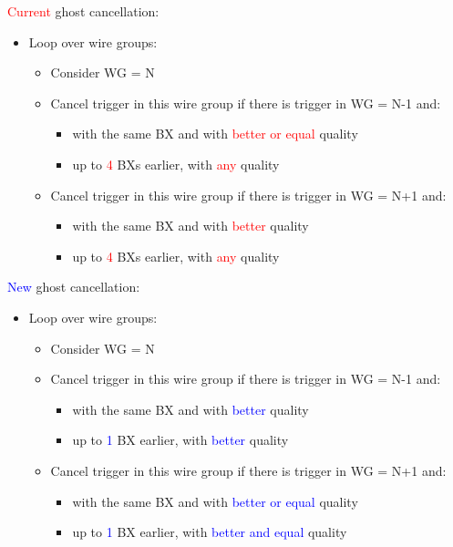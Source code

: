 \textcolor{red}{Current} ghost cancellation:
\begin{itemize}
    \item Loop over wire groups:
    \begin{itemize}
        \item Consider WG = N
        \item Cancel trigger in this wire group if there is trigger in WG = N-1 and:
        \begin{itemize}
            \item with the same BX and with \textcolor{red}{better or equal} quality
            \item up to \textcolor{red}{4} BXs earlier, with \textcolor{red}{any} quality
        \end{itemize}
        \item Cancel trigger in this wire group if there is trigger in WG = N+1 and:
        \begin{itemize}
            \item with the same BX and with \textcolor{red}{better} quality
            \item up to \textcolor{red}{4} BXs earlier, with \textcolor{red}{any} quality
        \end{itemize}
    \end{itemize}
\end{itemize}
\textcolor{blue}{New} ghost cancellation:
\begin{itemize}
    \item Loop over wire groups:
    \begin{itemize}
        \item Consider WG = N
        \item Cancel trigger in this wire group if there is trigger in WG = N-1 and:
        \begin{itemize}
            \item with the same BX and with \textcolor{blue}{better} quality
            \item up to \textcolor{blue}{1} BX earlier, with \textcolor{blue}{better} quality
        \end{itemize}
        \item Cancel trigger in this wire group if there is trigger in WG = N+1 and:
        \begin{itemize}
            \item with the same BX and with \textcolor{blue}{better or equal} quality
            \item up to \textcolor{blue}{1} BX earlier, with \textcolor{blue}{better and equal} quality
        \end{itemize}
    \end{itemize}
\end{itemize}


